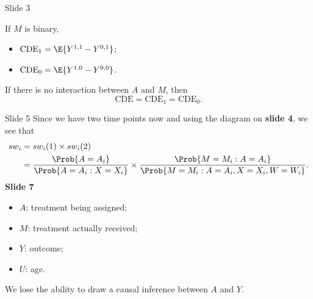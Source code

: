 \begin{Regular}{Slide 3}
    \begin{center}
    \end{center}
    If $ M $ is binary,
    \begin{itemize}
        \item $ \text{CDE}_1=\E{Y^{1,1}-Y^{0,1}} $;
        \item $ \text{CDE}_0=\E{Y^{1,0}-Y^{0,0}} $.
    \end{itemize}
    If there is no interaction between $ A $ and $ M $, then
    \[ \text{CDE}=\text{CDE}_1=\text{CDE}_0. \]
\end{Regular}
\begin{Regular}{Slide 5}
    Since we have two time points now and using the diagram
    on \textbf{slide 4}, we see that
    \begin{align*}
        sw_i
         & =sw_i(1)\times sw_i(2)                         \\
         & =\frac{\Prob{A=A_i}}{\Prob{A=A_i\given X=X_i}}
        \times \frac{\Prob{M=M_i\given A=A_i}}{\Prob{M=M_i\given A=A_i,X=X_i,W=W_i}}.
    \end{align*}
    \textbf{Slide 7}
    \begin{center}
    \end{center}
    \begin{itemize}
        \item $ A $: treatment being assigned;
        \item $ M $: treatment actually received;
        \item $ Y $: outcome;
        \item $ U $: age.
    \end{itemize}
    We lose the ability to draw a causal inference between $ A $ and $ Y $.
\end{Regular}

